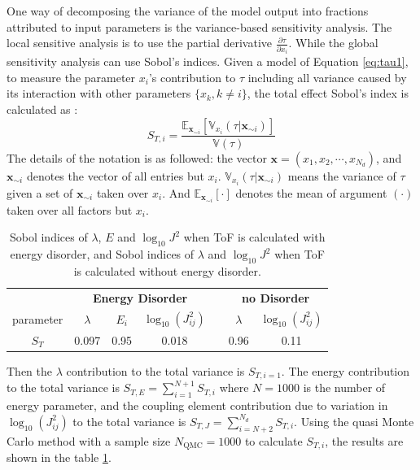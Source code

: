 \documentclass[%
 reprint,
 amsmath,amssymb,
 aps,
]{revtex4-2}
\begin{document}
One way of decomposing the variance of the model output into fractions attributed to input parameters is the variance-based sensitivity analysis. The local sensitive analysis is to use the partial derivative $\frac{\partial \tau}{\partial x_i}$. While the global sensitivity analysis can use Sobol's indices. Given a model of Equation \ref{eq:tau1}, to measure the parameter $x_i$'s contribution to $\tau$ including all variance caused by its interaction with other parameters $\{x_k, k \neq i \}$, the total effect Sobol's index is calculated as \cite{saltelli_variance_2010}:
\begin{equation}
    S_{T,i} = \frac{ \mathbb{E}_{\mathbf{x}_{\sim i}}[ \mathbb{V}_{x_i}(\tau|\mathbf{x}_{\sim i}) ] }{ \mathbb{V}(\tau) }
    \label{eq:STi}
\end{equation}
The details of the notation is as followed: the vector $\mathbf{x}=(x_1, x_2, \cdots, x_{N_d})$, and $\mathbf{x}_{\sim i}$ denotes the vector of all entries but $x_i$. 
$\mathbb{V}_{x_i}(\tau|\mathbf{x}_{\sim i})$ means the variance of $\tau$ given a set of $\mathbf{x}_{\sim i}$ taken over $x_i$. And $ \mathbb{E}_{\mathbf{x}_{\sim i}}[\cdot]$ denotes the mean of argument $(\cdot)$ taken over all factors but $x_i$.

%
\begin{table}[tbp]%
\caption{\label{tab:Sobol}%
Sobol indices of $\lambda$, $E$ and $\log_{10} J^2$ when ToF is calculated with energy disorder, and Sobol indices of $\lambda$ and $\log_{10} J^2$ when ToF is calculated without energy disorder.
}
\begin{ruledtabular}
  \begin{center}
    \begin{tabular}{c c c c c c c} %
      &  \multicolumn{3}{c}{\bf Energy Disorder} & &\multicolumn{2}{c}{\bf no Disorder}\\\cline{2-4}  \cline{6-7}
      parameter  & $\lambda$ & $ E_i$ & $ \log_{10}(J_{ij}^2)$ && $\lambda$ & $ \log_{10}(J_{ij}^2)$ \\ \hline
   $S_T$  & 0.097 & 0.95 & 0.018 && 0.96 & 0.11 \\
    \end{tabular}
  \end{center}
\end{ruledtabular}
\end{table}
%
Then the $\lambda$ contribution to the total variance is $S_{T,i=1}$.
The energy contribution to the total variance is $S_{T,E} = \sum\limits_{i=1}^{N+1} S_{T,i}$ where $N=1000$ is the number of energy parameter, and the coupling element contribution due to variation in $\log_{10}(J_{ij}^2)$ to the total variance is $S_{T,J}=\sum\limits_{i=N+2}^{N_d} S_{T,i}$. 
Using the quasi Monte Carlo method\cite{sobol_global_2001} with a sample size $N_\text{QMC}=1000$ to calculate $S_{T,i}$, the results are shown in the table \ref{tab:Sobol}.
\end{document}
